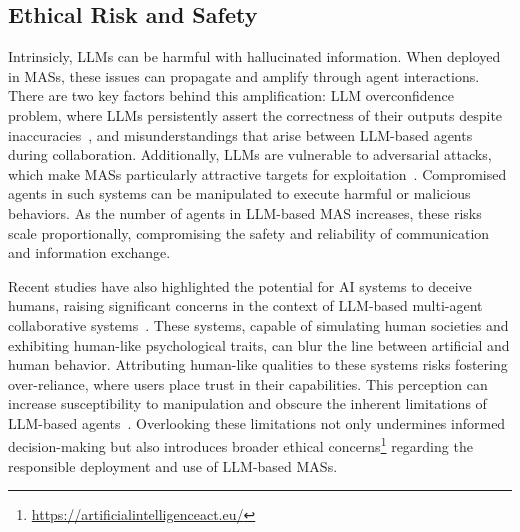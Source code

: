 \documentclass[acmsmall,nonacm]{acmart}
\begin{document}

    \subsection{Ethical Risk and Safety}
        Intrinsicly, LLMs can be harmful with hallucinated information. When deployed in MASs, these issues can propagate and amplify through agent interactions. There are two key factors behind this amplification: LLM overconfidence problem, where LLMs persistently assert the correctness of their outputs despite inaccuracies~\cite{zhang-etal-2024-exploring}, and misunderstandings that arise between LLM-based agents during collaboration. Additionally, LLMs are vulnerable to adversarial attacks, which make MASs particularly attractive targets for exploitation~\cite{shayegani2023survey}. Compromised agents in such systems can be manipulated to execute harmful or malicious behaviors. As the number of agents in LLM-based MAS increases, these risks scale proportionally, compromising the safety and reliability of communication and information exchange.

        Recent studies have also highlighted the potential for AI systems to deceive humans, raising significant concerns in the context of LLM-based multi-agent collaborative systems~\cite{meinke2024frontiermodelscapableincontext,deshpande2023anthropomorphizationaiopportunitiesrisks,Akbulut2024}. These systems, capable of simulating human societies and exhibiting human-like psychological traits, can blur the line between artificial and human behavior. Attributing human-like qualities to these systems risks fostering over-reliance, where users place trust in their capabilities. This perception can increase susceptibility to manipulation and obscure the inherent limitations of LLM-based agents~\cite{zhou-etal-2024-real}. Overlooking these limitations not only undermines informed decision-making but also introduces broader ethical concerns\footnote{\url{https://artificialintelligenceact.eu/}} regarding the responsible deployment and use of LLM-based MASs.
    
\end{document}
